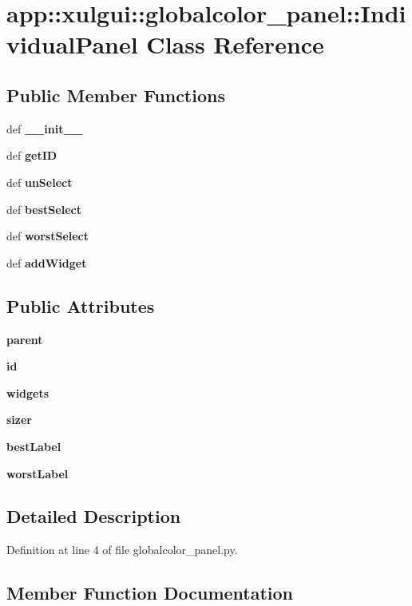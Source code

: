 \section{app::xulgui::globalcolor\_\-panel::IndividualPanel Class Reference}
\label{classapp_1_1xulgui_1_1globalcolor__panel_1_1IndividualPanel}
\subsection*{Public Member Functions}
\begin{CompactItemize}
\item 
def {\bf \_\-\_\-init\_\-\_\-}
\item 
def {\bf getID}
\item 
def {\bf unSelect}
\item 
def {\bf bestSelect}
\item 
def {\bf worstSelect}
\item 
def {\bf addWidget}
\end{CompactItemize}
\subsection*{Public Attributes}
\begin{CompactItemize}
\item 
{\bf parent}
\item 
{\bf id}
\item 
{\bf widgets}
\item 
{\bf sizer}
\item 
{\bf bestLabel}
\item 
{\bf worstLabel}
\end{CompactItemize}


\subsection{Detailed Description}


Definition at line 4 of file globalcolor\_\-panel.py.

\subsection{Member Function Documentation}
